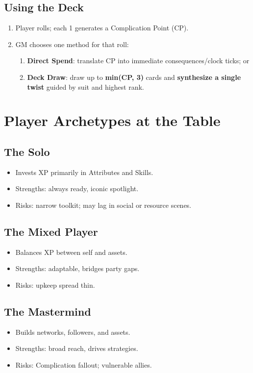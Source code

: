 \documentclass[11pt]{article}
\begin{document}
\subsection{Using the Deck}
\begin{enumerate}
  \item Player rolls; each 1 generates a Complication Point (CP).
  \item GM chooses one method for that roll:
  \begin{enumerate}
    \item \textbf{Direct Spend}: translate CP into immediate consequences/clock ticks; or
    \item \textbf{Deck Draw}: draw up to \textbf{min(CP, 3)} cards and \textbf{synthesize a single twist}
    guided by suit and highest rank.
  \end{enumerate}
\end{enumerate}

\section{Player Archetypes at the Table}

\subsection{The Solo}
\begin{itemize}
    \item Invests XP primarily in Attributes and Skills.
    \item Strengths: always ready, iconic spotlight.
    \item Risks: narrow toolkit; may lag in social or resource scenes.
\end{itemize}

\subsection{The Mixed Player}
\begin{itemize}
    \item Balances XP between self and assets.
    \item Strengths: adaptable, bridges party gaps.
    \item Risks: upkeep spread thin.
\end{itemize}

\subsection{The Mastermind}
\begin{itemize}
    \item Builds networks, followers, and assets.
    \item Strengths: broad reach, drives strategies.
    \item Risks: Complication fallout; vulnerable allies.
\end{itemize}
\end{document}
